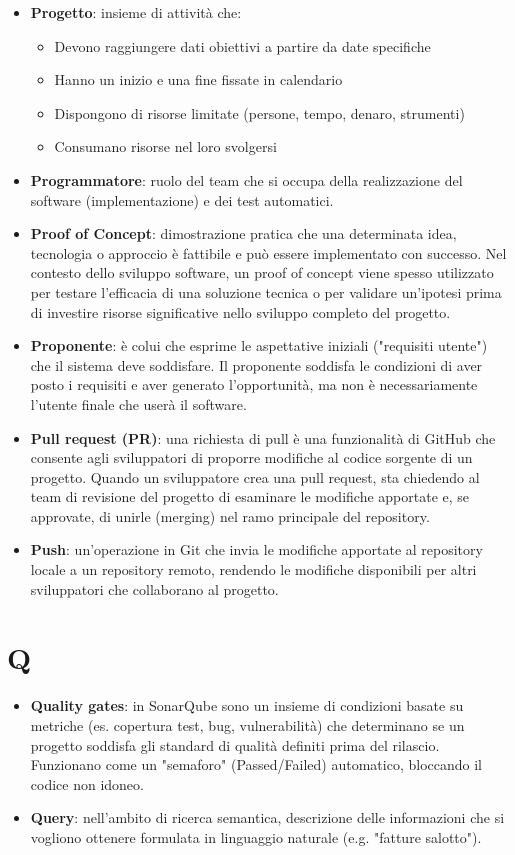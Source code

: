 \documentclass[a4paper,12pt]{article}
\begin{document}
\begin{itemize}
    \item \textbf{Progetto}: insieme di attività che:
    \begin{itemize}
        \item Devono raggiungere dati obiettivi a partire da date specifiche
        \item Hanno un inizio e una fine fissate in calendario
        \item Dispongono di risorse limitate (persone, tempo, denaro, strumenti)
        \item Consumano risorse nel loro svolgersi
    \end{itemize}
    \item \textbf{Programmatore}: ruolo del team che si occupa della realizzazione del software (implementazione) e dei test automatici.
    \item \textbf{Proof of Concept}: dimostrazione pratica che una determinata idea, tecnologia o approccio è fattibile e può essere implementato con successo. Nel contesto dello sviluppo software, un proof of concept viene spesso utilizzato per testare l'efficacia di una soluzione tecnica o per validare un'ipotesi prima di investire risorse significative nello sviluppo completo del progetto.
    \item \textbf{Proponente}: è colui che esprime le aspettative iniziali ("requisiti utente") che il sistema deve soddisfare. Il proponente soddisfa le condizioni di aver posto i requisiti e aver generato l'opportunità, ma non è necessariamente l'utente finale che userà il software.
    \item \textbf{Pull request (PR)}: una richiesta di pull è una funzionalità di GitHub che consente agli sviluppatori di proporre modifiche al codice sorgente di un progetto. Quando un sviluppatore crea una pull request, sta chiedendo al team di revisione del progetto di esaminare le modifiche apportate e, se approvate, di unirle (merging) nel ramo principale del repository.
    \item \textbf{Push}: un'operazione in Git che invia le modifiche apportate al repository locale a un repository remoto, rendendo le modifiche disponibili per altri sviluppatori che collaborano al progetto.
\end{itemize}
\section{Q}
\begin{itemize}
    \item \textbf{Quality gates}: in SonarQube sono un insieme di condizioni basate su metriche (es. copertura test, bug, vulnerabilità) che determinano se un progetto soddisfa gli standard di qualità definiti prima del rilascio. Funzionano come un "semaforo" (Passed/Failed) automatico, bloccando il codice non idoneo.
    \item \textbf{Query}: nell'ambito di ricerca semantica, descrizione delle informazioni che si vogliono ottenere formulata in linguaggio naturale (e.g. "fatture salotto").
\end{itemize}
\end{document}
